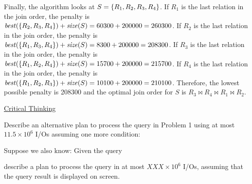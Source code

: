 \begin{sol}
    Finally, the algorithm looks at $S = \{R_1, R_2, R_3, R_4\}$. If $R_1$ is the last relation in the join order, the penalty is $\mathit{best}(\{R_2, R_3, R_4\}) + \mathit{size}(S) = 60300 + 200000 = 260300$. If $R_2$ is the last relation in the join order, the penalty is $\mathit{best}(\{R_1, R_3, R_4\}) + \mathit{size}(S) = 8300 + 200000 = 208300$.
    If $R_3$ is the last relation in the join order, the penalty is $\mathit{best}(\{R_1, R_2, R_4\}) + \mathit{size}(S) = 15700 + 200000 = 215700$.
    If $R_4$ is the last relation in the join order, the penalty is $\mathit{best}(\{R_1, R_2, R_3\}) + \mathit{size}(S) = 10100 + 200000 = 210100$. Therefore, the lowest possible penalty is 208300 and the optimal join order for $S$ is $R_3 \bowtie R_4 \bowtie R_1 \bowtie R_2$.
\end{sol}


\vgap

\begin{center}
    \uline{Critical Thinking}
\end{center}



 Describe an alternative plan to process the query in Problem 1 using at most $11.5 \times 10^6$ I/Os assuming one more condition:

%
%
%


 Suppose we also know:
Given the query



\noindent describe a plan to process the query in at most $XXX \times 10^6$ I/Os, assuming that the query result is displayed on screen.


